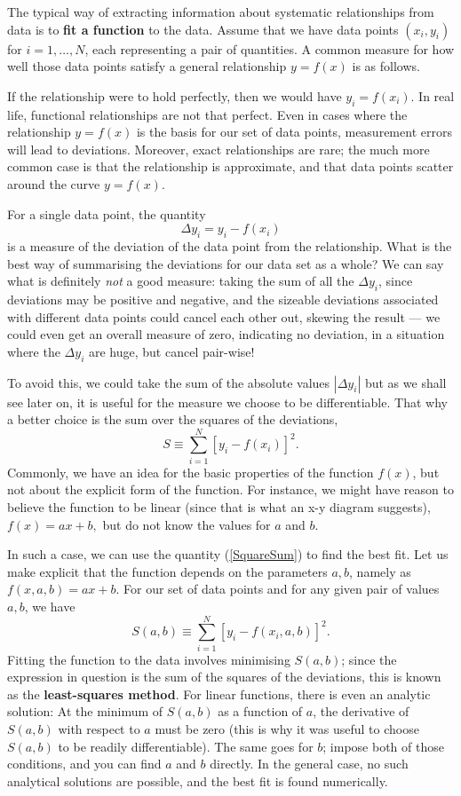 \documentclass[twocolumn,apj]{openjournal}
\newcommand{\be}{\begin{equation}}
\newcommand{\ee}{\end{equation}}
\begin{document}
The typical way of extracting information about systematic relationships from data is to {\bf fit a function} to the data. Assume that we have data points $(x_i,y_i)$ for $i=1,\ldots,N$, each representing a pair of quantities. A common measure for how well those data points satisfy a general relationship $y=f(x)$ is as follows.

If the relationship were to hold perfectly, then we would have $y_i=f(x_i)$. In real life, functional relationships are not that perfect. Even in cases where the relationship $y=f(x)$ is the basis for our set of data points, measurement errors will lead to deviations. Moreover, exact relationships are rare; the much more common case is that the relationship is approximate, and that data points scatter around the curve $y=f(x)$.

For a single data point, the quantity
\be
\Delta y_i = y_i-f(x_i) 
\ee
is a measure of the deviation of the data point from the relationship. What is the best way of summarising the deviations for our data set as a whole? We can say what is definitely {\em not} a good measure: taking the sum of all the $\Delta y_i$, since deviations may be positive and negative, and the sizeable deviations associated with different data points could cancel each other out, skewing the result --- we could even get an overall measure of zero, indicating no deviation, in a situation where the $\Delta y_i$ are huge, but cancel pair-wise!

To avoid this, we could take the sum of the absolute values $|\Delta y_i|$ but as we shall see later on, it is useful for the measure we choose to be differentiable. That why a better choice is the sum over the squares of the deviations, 
\be
S\equiv \sum_{i=1}^N [ y_i-f(x_i) ]^2.
\label{SquareSum}
\ee
Commonly, we have an idea for the basic properties of the function $f(x)$, but not about the explicit form of the function. For instance, we might have reason to believe the function to be linear (since that is what an x-y diagram suggests), $f(x) = ax+b,$ but do not know the values for $a$ and $b$. 

In such a case, we can use the quantity (\ref{SquareSum}) to find the best fit. Let us make explicit that the function depends on the parameters $a,b$, namely as $f(x,a,b) = ax+b.$ For our set of data points and for any given pair of values $a,b$, we have
\be
S(a,b)\equiv \sum_{i=1}^N [ y_i-f(x_i,a,b) ]^2.
\label{SquareSumParam}
\ee
Fitting the function to the data involves minimising $S(a,b)$; since the expression in question is the sum of the squares of the deviations, this is known as the {\bf least-squares method}. For linear functions, there is even an analytic solution: At the minimum of $S(a,b)$ as a function of $a$, the derivative of $S(a,b)$ with respect to $a$ must be zero (this is why it was useful to choose $S(a,b)$ to be readily differentiable). The same goes for $b$; impose both of those conditions, and you can find $a$ and $b$ directly. In the general case, no such analytical solutions are possible, and the best fit is found numerically.
\end{document}
